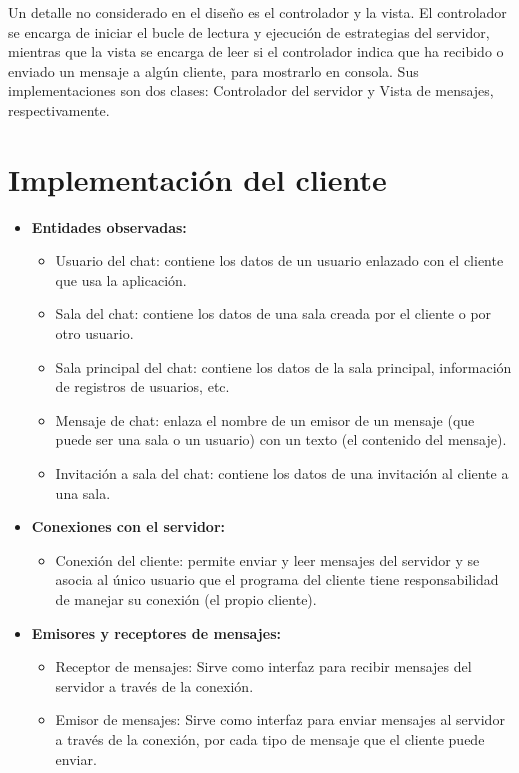 Un detalle no considerado en el diseño es el controlador y la vista. El controlador se encarga de iniciar el bucle de lectura y ejecución de estrategias del servidor, mientras que la vista se encarga de leer si el controlador indica que ha recibido o enviado un mensaje a algún cliente, para mostrarlo en consola. Sus implementaciones son dos clases: Controlador del servidor y Vista de mensajes, respectivamente.

\section{Implementación del cliente}

\begin{itemize}
	\item \textbf{Entidades observadas:}
	\begin{itemize}
		\item Usuario del chat: contiene los datos de un usuario enlazado con el cliente que usa la aplicación.
		\item Sala del chat: contiene los datos de una sala creada por el cliente o por otro usuario.
		\item Sala principal del chat: contiene los datos de la sala principal, información de registros de usuarios, etc.
		\item Mensaje de chat: enlaza el nombre de un emisor de un mensaje (que puede ser una sala o un usuario) con un texto (el contenido del mensaje).
		\item Invitación a sala del chat: contiene los datos de una invitación al cliente a una sala.
	\end{itemize}
	\item \textbf{Conexiones con el servidor:}
	\begin{itemize}
		\item Conexión del cliente: permite enviar y leer mensajes del servidor y se asocia al único usuario que el programa del cliente tiene responsabilidad de manejar su conexión (el propio cliente).
	
	\end{itemize}
	\item \textbf{Emisores y receptores de mensajes:}
	\begin{itemize}
		\item Receptor de mensajes: Sirve como interfaz para recibir mensajes del servidor a través de la conexión.
		\item Emisor de mensajes: Sirve como interfaz para enviar mensajes al servidor a través de la conexión, por cada tipo de mensaje que el cliente puede enviar.
	

\end{itemize}
\end{itemize}
